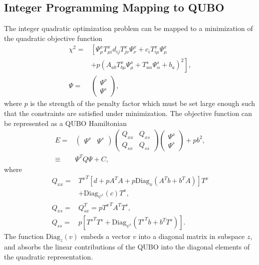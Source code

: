 \documentclass[prd,twocolumn,tightenlines,preprintnumbers,showpacs,superscriptaddress,notitlepage,nofootinbib,eqsecnum,floatfix,longbibliography]{revtex4}
\begin{document}
\subsection{Integer Programming Mapping to QUBO}
\label{sec:results:ilp}
The integer quadratic optimization problem can be mapped to a minimization of the quadratic objective function
\begin{align}
    \chi^2 = & \left[\Psi^x_{\mu} T^x_{\mu i}d_{ij} T^x_{j \nu}\Psi^x_\nu + c_i T^x_{i\mu} \Psi^x_\mu \right.
    \nonumber\\
    &\left.+ p (A_{a b} T^x_{b \mu} \Psi^x_{\mu} + T^s_{a \alpha} \Psi^s_\alpha + b_a)^2 \right],\\
    \Psi = & \begin{pmatrix}
    \Psi^x\\
    \Psi^s
    \end{pmatrix},
\end{align}
where $p$ is the strength of the penalty factor which must be set large enough such that the constraints are satisfied under minimization.
The objective function can be represented as a QUBO Hamiltonian
\begin{align}
    E = &
    \begin{pmatrix}
    \Psi^x & \Psi^s
    \end{pmatrix}
    \begin{pmatrix}
    Q_{xx} & Q_{xs}\\
    Q_{sx} & Q_{ss}
    \end{pmatrix}
    \begin{pmatrix}
    \Psi^x\\ \Psi^s
    \end{pmatrix} + pb^2,\\
    \equiv & \Psi^T Q \Psi + C,
    \label{eq:matrix_form}
\end{align}
where
\begin{align}
    Q_{xx} = & {T^{x}}^T \left[ d + p A^T A + p \mathrm{Diag}_{x} \left(A^T b + b^T A\right) \right] T^x \nonumber \\
    &+ \mathrm{Diag}_{\psi^x}(c) T^x,\\
    Q_{xs} = & Q_{sx}^T = p {T^{x}}^T A^T T^s,\\
    Q_{ss} = & p\left[ {T^{s}}^T T^s + \mathrm{Diag}_{\psi^s}\left( {T^{s}}^T b + b^T T^s\right) \right].
\end{align}
The function $\mathrm{Diag}_{z}(v)$ embeds a vector $v$ into a diagonal matrix in subspace $z$, and absorbs the linear contributions of the QUBO into the diagonal elements of the quadratic representation.
\end{document}
